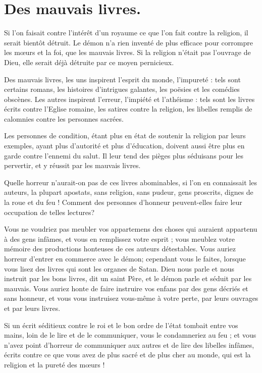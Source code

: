 \documentclass[instructions.tex]{subfiles}
\begin{document}
 
\chapter{Des mauvais livres.}
 
\primo Si l'on faisait contre l'intérêt d'un royaume ce que l'on fait contre la religion, il serait bientôt détruit. Le démon n'a rien inventé de plus efficace pour corrompre les mœurs et la foi, que les mauvais livres. Si la religion n'était pas l'ouvrage de Dieu, elle serait déjà détruite par ce moyen pernicieux.
 
Des mauvais livres, les uns inspirent l'esprit du monde, l'impureté : tels sont certains romans, les histoires d'intrigues galantes, les poësies et les comédies obscènes. Les autres inspirent l'erreur, l'impiété et l'athéisme : tels sont les livres écrits contre l'Eglise romaine, les satires contre la religion, les libelles remplis de calomnies contre les personnes sacrées.
 
Les personnes de condition, étant plus en état de soutenir la religion par leurs exemples, ayant plus d'autorité et plus d'éducation, doivent aussi être plus en garde contre l'ennemi du salut. Il leur tend des pièges plus séduisans pour les pervertir, et y réussit par les mauvais livres.
 
\secundo Quelle horreur n'aurait-on pas de ces livres abominables, si l'on en connaissait les auteurs, la plupart apostats, sans religion, sans pudeur, gens proscrits, dignes de la roue et du feu ! Comment des personnes d'honneur peuvent-elles faire leur occupation de telles lectures?
 
Vous ne voudriez pas meubler vos appartemens des choses qui auraient appartenu à des gens infâmes, et vous en remplissez votre esprit ; vous meublez votre mémoire des productions honteuses de ces auteurs détestables. Vous auriez horreur d'entrer en commerce avec le démon; cependant vous le faites, lorsque vous lisez des livres qui sont les organes de Satan. Dieu nous parle et nous instruit par les bons livres, dit un saint Père, et le démon parle et séduit par les mauvais. Vous auriez honte de faire instruire vos enfans par des gens décriés et sans honneur, et vous vous instruisez vous-même à votre perte, par leurs ouvrages et par leurs livres.
 
Si un écrit séditieux contre le roi et le bon ordre de l'état tombait entre vos mains, loin de le lire et de le communiquer, vous le condamneriez au feu ; et vous n'avez point d'horreur de communiquer aux autres et de lire des libelles infâmes, écrits contre ce que vous avez de plus sacré et de plus cher au monde, qui est la religion et la pureté des mœurs !
 
\end{document}
